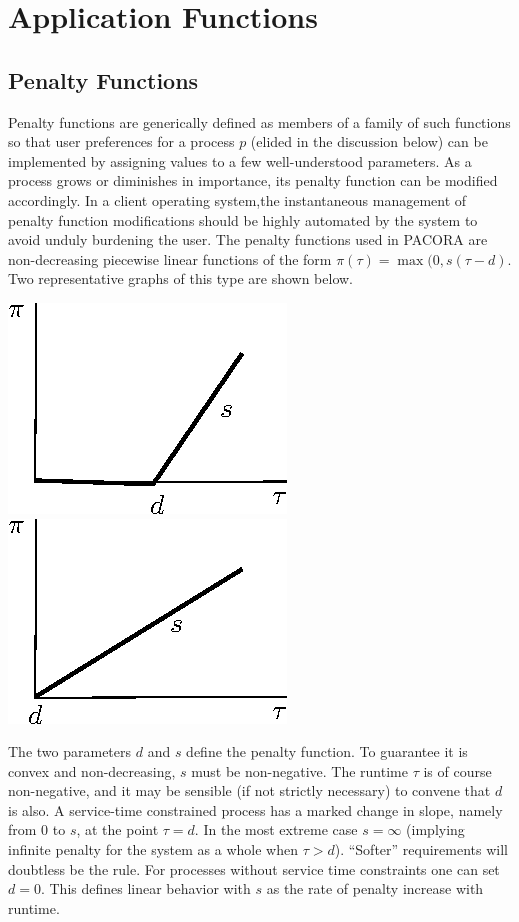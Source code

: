 \section{Application Functions}
\subsection*{Penalty Functions}

Penalty functions  are generically defined as members of a family of such functions
so that user preferences for a process $p$ (elided in the discussion below)
can be implemented by assigning values to a few well-understood parameters. 
As a process grows or diminishes in importance, its penalty function can be modified accordingly.
In a client operating system,the instantaneous management of penalty function modifications
should be highly automated by the system to avoid unduly burdening the user.
The penalty functions used in PACORA are non-decreasing piecewise linear functions of the form
$\pi(\tau) = \max(0, s(\tau - d)$.
Two representative graphs of this type are shown below.

\includegraphics*{Penalty1.eps}
\includegraphics*{Penalty2.eps}

The two parameters $d$ and $s$ define the penalty function.
To guarantee it is convex and non-decreasing, $s$ must be non-negative.
The runtime $\tau$  is of course non-negative,
and it may be sensible (if not strictly necessary) to convene that $d$ is also.
A service-time constrained process has a marked change in slope, namely from 0 to $s$, at the point $\tau= d$.
In the most extreme case $s = \infty$ (implying infinite penalty for the system as a whole when $\tau > d$).  ``Softer'' requirements will doubtless be the rule.
For processes without service time constraints one can set $d = 0$.
This defines linear behavior with $s$ as the rate of penalty increase with runtime.

